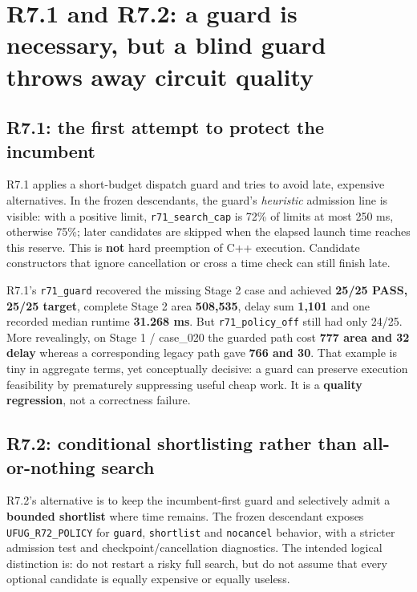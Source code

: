 \section{R7.1 and R7.2: a guard is necessary, but a blind guard throws away circuit quality}\label{r7.1-and-r7.2-a-guard-is-necessary-but-a-blind-guard-throws-away-circuit-quality}

\subsection{R7.1: the first attempt to protect the incumbent}\label{r7.1-the-first-attempt-to-protect-the-incumbent}

R7.1 applies a short-budget dispatch guard and tries to avoid late, expensive alternatives. In the frozen descendants, the guard's \emph{heuristic} admission line is visible: with a positive limit, \texttt{r71\_search\_cap} is 72\% of limits at most 250 ms, otherwise 75\%; later candidates are skipped when the elapsed launch time reaches this reserve. This is \textbf{not} hard preemption of C++ execution. Candidate constructors that ignore cancellation or cross a time check can still finish late.

R7.1's \texttt{r71\_guard} recovered the missing Stage 2 case and achieved \textbf{25/25 PASS, 25/25 target}, complete Stage 2 area \textbf{508,535}, delay sum \textbf{1,101} and one recorded median runtime \textbf{31.268 ms}. But \texttt{r71\_policy\_off} still had only 24/25. More revealingly, on Stage 1 / case\_020 the guarded path cost \textbf{777 area and 32 delay} whereas a corresponding legacy path gave \textbf{766 and 30}. That example is tiny in aggregate terms, yet conceptually decisive: a guard can preserve execution feasibility by prematurely suppressing useful cheap work. It is a \textbf{quality regression}, not a correctness failure.

\subsection{R7.2: conditional shortlisting rather than all-or-nothing search}\label{r7.2-conditional-shortlisting-rather-than-all-or-nothing-search}

R7.2's alternative is to keep the incumbent-first guard and selectively admit a \textbf{bounded shortlist} where time remains. The frozen descendant exposes \texttt{UFUG\_R72\_POLICY} for \texttt{guard}, \texttt{shortlist} and \texttt{nocancel} behavior, with a stricter admission test and checkpoint/cancellation diagnostics. The intended logical distinction is: do not restart a risky full search, but do not assume that every optional candidate is equally expensive or equally useless.

